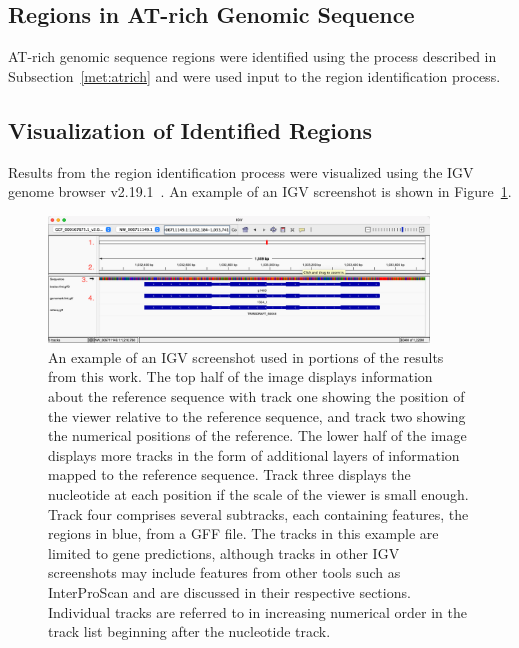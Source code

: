 \subsection{Regions in AT-rich Genomic Sequence}\label{met:atrich2}

AT-rich genomic sequence regions were identified using the
process described in Subsection~\ref{met:atrich} and were used input to the region identification process.

\subsection{Visualization of Identified Regions}\label{section:igv-met}

Results from the region identification process were visualized using
the IGV genome browser v2.19.1~\cite{robinson2011a}. An example of an
IGV screenshot is shown in Figure~\ref{fig:igv-methods}.

\begin{figure}
  \centering
  \includegraphics[width=0.9\textwidth]{figures/igv/igv-agreement-thin-number}
  \caption[IGV example]{An example of an IGV screenshot used in
    portions of the results from this work. The top half of the image
    displays information about the reference sequence with track one
    showing the position of the viewer relative to the reference
    sequence, and track two showing the numerical positions of the
    reference. The lower half of the image displays more tracks in the
    form of additional layers of information mapped to the reference
    sequence. Track three displays the nucleotide at
    each position if the scale of the viewer is small enough. Track
    four comprises several subtracks, each containing features, the
    regions in blue, from a GFF file. The tracks in this example are
    limited to gene predictions, although tracks in other IGV
    screenshots may include features from other tools such as
    InterProScan and are discussed in their respective
    sections. Individual tracks are referred to in increasing
    numerical order in the track list beginning after the nucleotide track.}\label{fig:igv-methods}
\end{figure}

